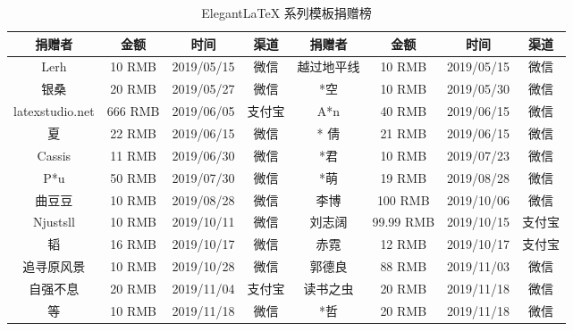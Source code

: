 \documentclass[cn,hazy,blue,14pt,screen]{elegantnote}
\begin{document}
\begin{table}[htbp]
    \scriptsize
    \centering
    \caption{Elegant\LaTeX{} 系列模板捐赠榜}
    \begin{tabular}{*{8}{>{\scriptsize}c}}
        \toprule
        \textbf{捐赠者} & \textbf{金额} & \textbf{时间} & \textbf{渠道} & \textbf{捐赠者} & \textbf{金额} & \textbf{时间} & \textbf{渠道} \\
        \midrule
        Lerh            & 10 RMB        & 2019/05/15    & 微信          & 越过地平线      & 10 RMB        & 2019/05/15    & 微信          \\
        银桑            & 20 RMB        & 2019/05/27    & 微信          & *空             & 10 RMB        & 2019/05/30    & 微信          \\
        latexstudio.net & 666 RMB       & 2019/06/05    & 支付宝        & A*n             & 40 RMB        & 2019/06/15    & 微信          \\
        * 夏            & 22 RMB        & 2019/06/15    & 微信          & * 倩            & 21 RMB        & 2019/06/15    & 微信          \\
        Cassis          & 11 RMB        & 2019/06/30    & 微信          & *君             & 10 RMB        & 2019/07/23    & 微信          \\
        P*u             & 50 RMB        & 2019/07/30    & 微信          & *萌             & 19 RMB        & 2019/08/28    & 微信          \\
        曲豆豆          & 10 RMB        & 2019/08/28    & 微信          & 李博            & 100 RMB       & 2019/10/06    & 微信          \\
        Njustsll        & 10 RMB        & 2019/10/11    & 微信          & 刘志阔          & 99.99 RMB     & 2019/10/15    & 支付宝        \\
        * 韬            & 16 RMB        & 2019/10/17    & 微信          & 赤霓            & 12 RMB        & 2019/10/17    & 支付宝        \\
        追寻原风景      & 10 RMB        & 2019/10/28    & 微信          & 郭德良          & 88 RMB        & 2019/11/03    & 微信          \\
        自强不息        & 20 RMB        & 2019/11/04    & 支付宝        & 读书之虫        & 20 RMB        & 2019/11/18    & 微信          \\
        *等             & 10 RMB        & 2019/11/18    & 微信          & *哲             & 20 RMB        & 2019/11/18    & 微信          \\

\end{tabular}
\end{table}
\end{document}
